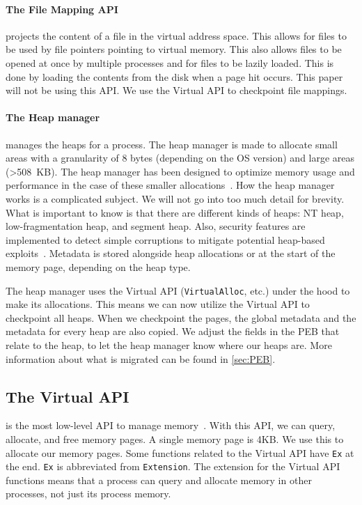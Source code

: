 \documentclass[a4paper, 11pt, english]{report}
\begin{document}
\paragraph{The File Mapping API}
projects the content of a file in the virtual address space. This allows for files to be used by file pointers pointing to virtual memory. This also allows files to be opened at once by multiple processes and for files to be lazily loaded. This is done by loading the contents from the disk when a page hit occurs. This paper will not be using this API.
We use the Virtual API to checkpoint file mappings.

\paragraph{The Heap manager}
manages the heaps for a process. The heap manager is made to allocate small areas with a granularity of 8 bytes (depending on the OS version) and large areas (\textgreater508~KB). The heap manager has been designed to optimize memory usage and performance in the case of these smaller allocations~\cite [p.332]{windows-internals}. How the heap manager works is a complicated subject. We will not go into too much detail for brevity. What is important to know is that there are different kinds of heaps: NT heap, low-fragmentation heap, and segment heap. Also, security features are implemented to detect simple corruptions to mitigate potential heap-based exploits~\cite[p.402]{what-makes-it-page}. Metadata is stored alongside heap allocations or at the start of the memory page, depending on the heap type. 

The heap manager uses the Virtual API (\texttt{VirtualAlloc}, etc.) under the hood to make its allocations. This means we can now utilize the Virtual API to checkpoint all heaps.
When we checkpoint the pages, the global metadata and the metadata for every heap are also copied. We adjust the fields in the PEB that relate to the heap, to let the heap manager know where our heaps are. More information about what is migrated can be found in \autoref{sec:PEB}.

\subsection{The Virtual API}
\label{sec:virtual-api}
is the most low-level API to manage memory~\cite[p.309]{windows-internals}. With this API, we can query, allocate, and free memory pages. A single memory page is 4KB. We use this to allocate our memory pages.
Some functions related to the Virtual API have \texttt{Ex} at the end. \texttt{Ex} is abbreviated from \texttt{Extension}. The extension for the Virtual API functions means that a process can query and allocate memory in other processes, not just its process memory.
\end{document}
